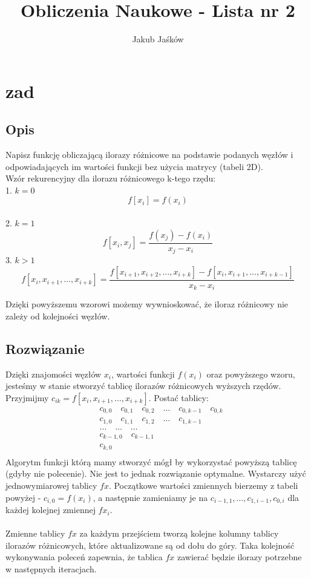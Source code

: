 \documentclass[10pt,a4paper, polish]{article}
\author{Jakub Jaśków}
\title{Obliczenia Naukowe - Lista nr 2}
\begin{document}
\maketitle

\section{zad}

\subsection{Opis}

Napisz funkcję obliczającą ilorazy różnicowe na podstawie podanych węzłów i odpowiadających im wartości funkcji bez użycia matrycy (tabeli 2D).\\

\noindent Wzór rekurencyjny dla ilorazu różnicowego k-tego rzędu:\\
1. $k = 0$  $$f[x_i] = f(x_i)$$\\
2. $k = 1$  $$f[x_i,x_j] = \frac{f(x_j) - f(x_i)}{x_j - x_i}$$  
3. $k > 1$  $$f[x_i,x_{i+1}, \ldots, x_{i+k}] = \frac{f[x_{i+1},x_{i+2},\ldots,x_{i+k}]-f[x_i,x_{i+1},\ldots,x_{i+k-1}]}{x_k-x_i}$$

\noindent Dzięki powyższemu wzorowi możemy wywnioskować, że iloraz różnicowy nie zależy od kolejności węzłów.
\subsection*{Rozwiązanie}
Dzięki znajomości węzłów $x_i$, wartości funkcji $f(x_i)$ oraz powyższego wzoru, jesteśmy w stanie stworzyć tablicę ilorazów różnicowych wyższych rzędów. Przyjmijmy $c_{ik} = f[x_i,x_{i+1}, \ldots, x_{i+k}]$. Postać tablicy:
\begin{align}
&c_{0,0} \quad c_{0,1} \quad c_{0,2} \quad \ldots \quad c_{0,k-1} \quad c_{0,k} \nonumber \\
&c_{1,0} \quad c_{1,1} \quad c_{1,2} \quad \ldots \quad c_{1,k-1} \nonumber \\
&\ldots \quad \ldots \quad \ldots \nonumber \\
&c_{k-1,0} \quad c_{k-1,1} \nonumber \\
&c_{k,0} \nonumber \\
\label{il}
\end{align}
Algorytm funkcji którą mamy stworzyć mógł by wykorzystać powyższą tablicę (gdyby nie polecenie). Nie jest to jednak rozwiązanie optymalne. Wystarczy użyć jednowymiarowej tablicy $fx$. Początkowe wartości zmiennych bierzemy z tabeli powyżej - $c_{i,0} = f(x_i)$, a następnie zamieniamy je na $c_{i-1,1}, \ldots, c_{1,i-1}, c_{0,i}$ dla każdej kolejnej zmiennej $fx_i$.\\\\
Zmienne tablicy $fx$ za każdym przejściem tworzą kolejne kolumny tablicy ilorazów różnicowych, które aktualizowane są od dołu do góry. Taka kolejność wykonywania poleceń zapewnia, że tablica $fx$ zawierać będzie ilorazy potrzebne w następnych iteracjach.
\end{document}
